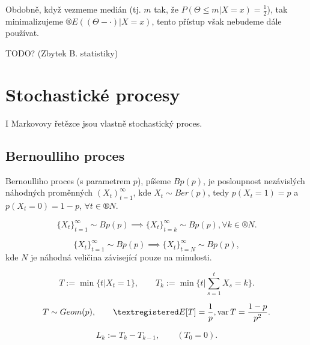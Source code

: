 \documentclass[12pt]{article}					%
\begin{document}
\begin{poznamka}[Medián]
	Obdobně, když vezmeme medián (tj. $m$ tak, že $P(\Theta ≤ m | X = x) = \frac{1}{2}$), tak minimalizujeme $®E((\Theta - ·) | X = x)$, tento přístup však nebudeme dále používat.
\end{poznamka}

TODO? (Zbytek B. statistiky) %

\section{Stochastické procesy}

\begin{poznamka}
	I Markovovy řetězce jsou vlastně stochastický proces.
\end{poznamka}

\subsection{Bernoulliho proces}

\begin{definice}
	Bernoulliho proces (s parametrem $p$), píšeme $Bp(p)$, je posloupnost nezávislých náhodných proměnných $(X_t)_{t=1}^∞$, kde $X_t \sim Ber(p)$, tedy $p(X_t = 1) = p$ a $p(X_t = 0) = 1 - p$, $\forall t \in ®N$.
\end{definice}

\begin{dusledek}
	$$ \{X_t\}_{t = 1}^∞ \sim Bp(p) \implies \{X_t\}_{t = k}^∞ \sim Bp(p), \forall k \in ®N. $$

	$$ \{X_t\}_{t = 1}^∞ \sim Bp(p) \implies \{X_t\}_{t = N}^∞ \sim Bp(p), $$
	kde $N$ je náhodná veličina závisející pouze na minulosti.
\end{dusledek}

\begin{definice}
	$$ T := \min\{t | X_t = 1\}, \qquad T_k := \min\{t | \sum_{s = 1}^t X_s = k\}. $$
\end{definice}

\begin{dusledek}
	$$ T \sim Geom(p), \qquad ®E[T] = \frac{1}{p}, \var T = \frac{1 - p}{p^2}. $$
\end{dusledek}

\begin{definice}
	$$ L_k := T_k - T_{k-1}, \qquad (T_0 = 0). $$
\end{definice}
\end{document}
